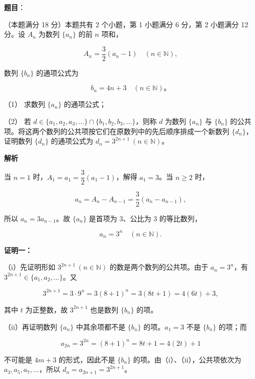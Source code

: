 \begin{answer}

\textbf{题目}：

（本题满分 18 分）本题共有 2 个小题，第 1 小题满分 6 分，第 2 小题满分 12 分。设 $A_n$ 为数列 $\{a_n\}$ 的前 $n$ 项和，

\nopagebreak[4]
\[
A_n=\dfrac{3}{2}(a_n-1)\quad(n\in\mathbb N),
\]

数列 $\{b_n\}$ 的通项公式为

\nopagebreak[4]
\[
b_n=4n+3\quad(n\in\mathbb N)\mbox{。}
\]

（1） 求数列 $\{a_n\}$ 的通项公式；

（2） 若 $d\in\{a_1,a_2,a_3,\ldots\}\cap\{b_1,b_2,b_3,\ldots\}$，则称 $d$ 为数列 $\{a_n\}$ 与 $\{b_n\}$ 的公共项。将这两个数列的公共项按它们在原数列中的先后顺序排成一个新数列 $\{d_n\}$，证明数列 $\{d_n\}$ 的通项公式为 $d_n=3^{2n+1}\ (n\in\mathbb N)$。

\textbf{解析}


当 $n=1$ 时，$A_1=a_1=\dfrac32(a_1-1)$，解得 $a_1=3$。当 $n\ge2$ 时，

\nopagebreak[4]
\[
a_n=A_n-A_{n-1}=\dfrac32(a_n-a_{n-1}),
\]

所以 $a_n=3a_{n-1}$。故 $\{a_n\}$ 是首项为 $3$、公比为 $3$ 的等比数列，

\nopagebreak[4]
\[
a_n=3^n\quad(n\in\mathbb N).
\]


\textbf{证明一：}

（i）先证明形如 $3^{2n+1}\ (n\in\mathbb N)$ 的数是两个数列的公共项。由于 $a_n=3^n$，有 $3^{2n+1}\in\{a_1,a_2,\ldots\}$。又

\nopagebreak[4]
\[
3^{2n+1}=3\cdot9^n=3(8+1)^n=3(8t+1)=4(6t)+3,
\]

其中 $t$ 为正整数，故 $3^{2n+1}$ 也是数列 $\{b_n\}$ 的项。

（ii）再证明数列 $\{a_n\}$ 中其余项都不是 $\{b_n\}$ 的项。$a_1=3$ 不是 $\{b_n\}$ 的项；而

\nopagebreak[4]
\[
a_{2n}=3^{2n}=(8+1)^n=8t+1=4(2t)+1
\]

不可能是 $4m+3$ 的形式，因此不是 $\{b_n\}$ 的项。由（i）、（ii），公共项依次为 $a_3,a_5,a_7,\ldots$，所以 $d_n=a_{2n+1}=3^{2n+1}$。


\end{answer}
